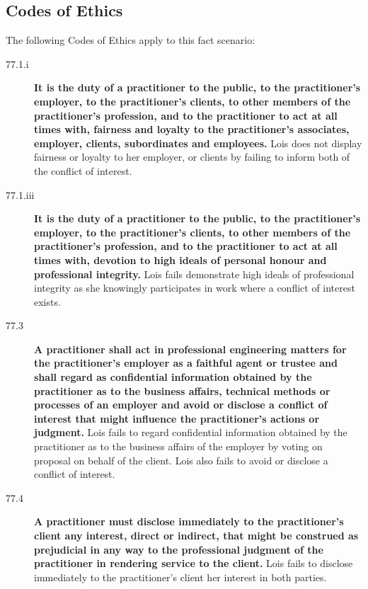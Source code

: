 \documentclass[12pt,letterpaper]{article}
\begin{document}
\subsection*{Codes of Ethics}
The following Codes of Ethics apply to this fact scenario:
\begin{description}
	\item[77.1.i] \textbf{It is the duty of a practitioner to the public, to the practitioner's employer, to the practitioner's clients, to other members of the practitioner's profession, and to the practitioner to act at all times with, fairness and loyalty to the practitioner's associates, employer, clients, subordinates and employees.} Lois does not display fairness or loyalty to her employer, or clients by failing to inform both of the conflict of interest.
	\item[77.1.iii] \textbf{It is the duty of a practitioner to the public, to the practitioner's employer, to the practitioner's clients, to other members of the practitioner's profession, and to the practitioner to act at all times with, devotion to high ideals of personal honour and professional integrity.} Lois fails demonstrate high ideals of professional integrity as she knowingly participates in work where a conflict of interest exists.
	\item[77.3] \textbf{A practitioner shall act in professional engineering matters for the practitioner's employer as a faithful agent or trustee and shall regard as confidential information obtained by the practitioner as to the business affairs, technical methods or processes of an employer and avoid or disclose a conflict of interest that might influence the practitioner's actions or judgment.} Lois fails to regard confidential information obtained by the practitioner as to the business affairs of the employer by voting on proposal on behalf of the client. Lois also fails to avoid or disclose a conflict of interest.
	\item[77.4] \textbf{A practitioner must disclose immediately to the practitioner's client any interest, direct or indirect, that might be construed as prejudicial in any way to the professional judgment of the practitioner in rendering service to the client.} Lois fails to disclose immediately to the practitioner's client her interest in both parties.
\end{description}
\end{document}
